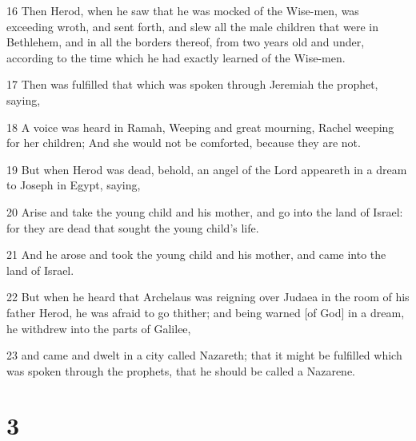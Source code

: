 \par 16 Then Herod, when he saw that he was mocked of the Wise-men, was exceeding wroth, and sent forth, and slew all the male children that were in Bethlehem, and in all the borders thereof, from two years old and under, according to the time which he had exactly learned of the Wise-men.
\par 17 Then was fulfilled that which was spoken through Jeremiah the prophet, saying,
\par 18 A voice was heard in Ramah, Weeping and great mourning, Rachel weeping for her children; And she would not be comforted, because they are not.
\par 19 But when Herod was dead, behold, an angel of the Lord appeareth in a dream to Joseph in Egypt, saying,
\par 20 Arise and take the young child and his mother, and go into the land of Israel: for they are dead that sought the young child's life.
\par 21 And he arose and took the young child and his mother, and came into the land of Israel.
\par 22 But when he heard that Archelaus was reigning over Judaea in the room of his father Herod, he was afraid to go thither; and being warned [of God] in a dream, he withdrew into the parts of Galilee,
\par 23 and came and dwelt in a city called Nazareth; that it might be fulfilled which was spoken through the prophets, that he should be called a Nazarene.

\chapter{3}

